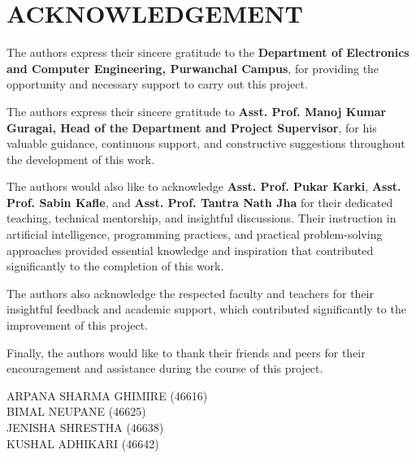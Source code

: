 \chapter*{ACKNOWLEDGEMENT}


The authors express their sincere gratitude to the \textbf{Department of Electronics and Computer Engineering, Purwanchal Campus}, for providing the opportunity and necessary support to carry out this project.

The authors express their sincere gratitude to \textbf{Asst. Prof. Manoj Kumar Guragai, Head of the Department and Project Supervisor}, for his valuable guidance, continuous support, and constructive suggestions throughout the development of this work.

The authors would also like to acknowledge \textbf{Asst. Prof. Pukar Karki}, \textbf{Asst. Prof. Sabin Kafle}, and \textbf{Asst. Prof. Tantra Nath Jha} for their dedicated teaching, technical mentorship, and insightful discussions. Their instruction in artificial intelligence, programming practices, and practical problem-solving approaches provided essential knowledge and inspiration that contributed significantly to the completion of this work.

The authors also acknowledge the respected faculty and teachers for their insightful feedback and academic support, which contributed significantly to the improvement of this project.

Finally, the authors would like to thank their friends and peers for their encouragement and assistance during the course of this project.






\vspace{1cm}
ARPANA SHARMA GHIMIRE (46616)\\
BIMAL NEUPANE (46625)\\
JENISHA SHRESTHA (46638)\\
KUSHAL ADHIKARI (46642)\\

